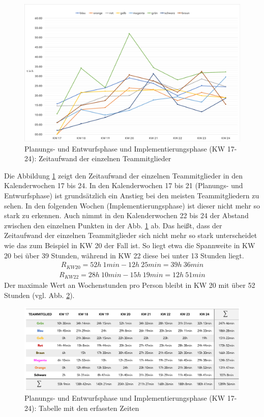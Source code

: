 \documentclass[../review_3.tex]{subfiles}
\begin{document}
\begin{figure} [h]
    \centering
    \includegraphics[width = 0.9\linewidth, trim=10pt 10pt 10pt 10pt, clip]{img/kimai10.pdf}
    \caption{Planungs- und Entwurfsphase und Implementierungsphase (KW 17-24): Zeitaufwand der einzelnen Teammitglieder}
    \label{kimai10}
\end{figure}

Die Abbildung \ref{kimai10} zeigt den Zeitaufwand der einzelnen Teammitglieder in den Kalenderwochen 17 bis 24. In den Kalenderwochen 17 bis 21 (Planungs- und Entwurfsphase) ist grundsätzlich ein Anstieg bei den meisten Teammitgliedern zu sehen. In den folgenden Wochen (Implementierungsphase) ist dieser nicht mehr so stark zu erkennen. Auch nimmt in den Kalenderwochen 22 bis 24 der Abstand zwischen den einzelnen Punkten in der Abb. \ref{kimai10} ab. Das heißt, dass der Zeitaufwand der einzelnen Teammitglieder sich nicht mehr so stark unterscheidet wie das zum Beispiel in KW 20 der Fall ist. So liegt etwa die Spannweite in KW 20 bei über 39 Stunden, während in KW 22 diese bei unter 13 Stunden liegt.
\begin{align*}
    R_{KW20} = 52h\: 1min - 12h\: 25min = 39h\: 36min
\end{align*}
\begin{align*}
    R_{KW22} = 28h\: 10min - 15h\: 19min = 12h\: 51min
\end{align*}
Der maximale Wert an Wochenstunden pro Person bleibt in KW 20 mit über 52 Stunden (vgl. Abb. \ref{kimai12}).

\begin{figure} [H]
    \centering
    \includegraphics[width = 0.9\linewidth]{img/kimai12.png}
    \caption{Planungs- und Entwurfsphase und Implementierungsphase (KW 17-24): Tabelle mit den erfassten Zeiten}
    \label{kimai12}
\end{figure}
\end{document}
